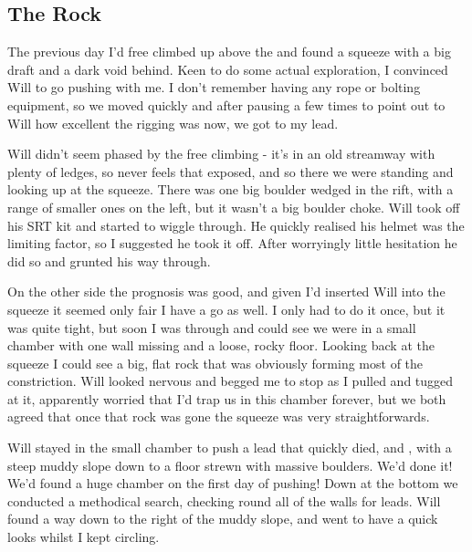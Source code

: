 \subsection{The Rock}
The previous day I’d free climbed up above the  and found a squeeze with a big draft and a dark void behind. Keen to do some actual exploration, I convinced Will to go pushing with me. I don’t remember having any rope or bolting equipment, so we moved quickly and after pausing a few times to point out to Will how excellent the rigging was now, we got to my lead.

Will didn’t seem phased by the free climbing - it’s in an old streamway with plenty of ledges, so never feels that exposed, and so there we were standing and looking up at the squeeze. There was one big boulder wedged in the rift, with a range of smaller ones on the left, but it wasn’t a big boulder choke. Will took off his SRT kit and started to wiggle through. He quickly realised his helmet was the limiting factor, so I suggested he took it off. After worryingly little hesitation he did so and grunted his way through.

On the other side the prognosis was good, and given I’d inserted Will into the squeeze it seemed only fair I have a go as well. I only had to do it once, but it was quite tight, but soon I was through and could see we were in a small chamber with one wall missing and a loose, rocky floor. Looking back at the squeeze I could see a big, flat rock that was obviously forming most of the constriction. Will looked nervous and begged me to stop as I pulled and tugged at it, apparently worried that I’d trap us in this chamber forever, but we both agreed that once that rock was gone the squeeze was very straightforwards.

Will stayed in the small chamber to push a lead that quickly died, and , with a steep muddy slope down to a floor strewn with massive boulders. We’d done it! We’d found a huge chamber on the first day of pushing! Down at the bottom we conducted a methodical search, checking round all of the walls for leads. Will found a way down to the right of the muddy slope, and went to have a quick looks whilst I kept circling.

